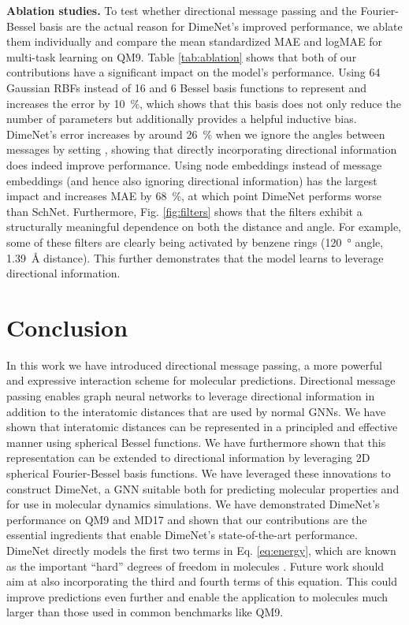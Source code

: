 \documentclass{article} \usepackage{iclr2020_conference,times}
\begin{document}
\textbf{Ablation studies.} To test whether directional message passing and the Fourier-Bessel basis are the actual reason for DimeNet's improved performance, we ablate them individually and compare the mean standardized MAE and logMAE for multi-task learning on QM9. Table \ref{tab:ablation} shows that both of our contributions have a significant impact on the model's performance. Using 64 Gaussian RBFs instead of 16 and 6 Bessel basis functions to represent  and  increases the error by \SI{10}{\percent}, which shows that this basis does not only reduce the number of parameters but additionally provides a helpful inductive bias. DimeNet's error increases by around \SI{26}{\percent} when we ignore the angles between messages by setting , showing that directly incorporating directional information does indeed improve performance. Using node embeddings instead of message embeddings (and hence also ignoring directional information) has the largest impact and increases MAE by \SI{68}{\percent}, at which point DimeNet performs worse than SchNet. Furthermore, Fig. \ref{fig:filters} shows that the filters exhibit a structurally meaningful dependence on both the distance and angle. For example, some of these filters are clearly being activated by benzene rings (\SI{120}{\degree} angle, \SI{1.39}{\angstrom} distance). This further demonstrates that the model learns to leverage directional information.

\section{Conclusion}

In this work we have introduced directional message passing, a more powerful and expressive interaction scheme for molecular predictions. Directional message passing enables graph neural networks to leverage directional information in addition to the interatomic distances that are used by normal GNNs. We have shown that interatomic distances can be represented in a principled and effective manner using spherical Bessel functions. We have furthermore shown that this representation can be extended to directional information by leveraging 2D spherical Fourier-Bessel basis functions. We have leveraged these innovations to construct DimeNet, a GNN suitable both for predicting molecular properties and for use in molecular dynamics simulations. We have demonstrated DimeNet's performance on QM9 and MD17 and shown that our contributions are the essential ingredients that enable DimeNet's state-of-the-art performance.
DimeNet directly models the first two terms in Eq. \ref{eq:energy}, which are known as the important ``hard'' degrees of freedom in molecules \citep{leach_molecular_2001}. Future work should aim at also incorporating the third and fourth terms of this equation. This could improve predictions even further and enable the application to molecules much larger than those used in common benchmarks like QM9.
\end{document}

